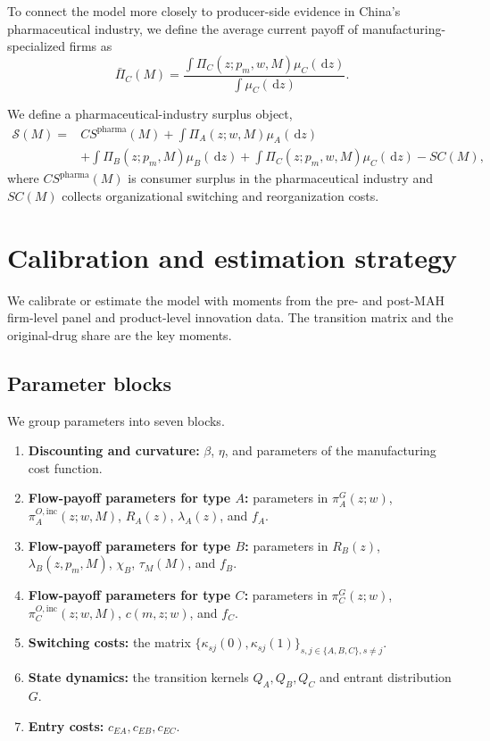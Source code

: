 \documentclass[12pt]{article}
\newcommand{\1}{\mathbf{1}}
\newcommand{\dd}{\,\mathrm{d}}
\newcommand{\Surp}{\mathcal{S}}
\begin{document}
To connect the model more closely to producer-side evidence in China's pharmaceutical industry, we define the average current payoff of manufacturing-specialized firms as
\begin{equation}
\bar\Pi_C(M)=\frac{\int \Pi_C(z;p_m,w,M)\mu_C(\dd z)}{\int \mu_C(\dd z)}.
\end{equation}

We define a pharmaceutical-industry surplus object,
\begin{equation}
\begin{aligned}
\Surp(M)={}&CS^{\mathrm{pharma}}(M)+\int \Pi_A(z;w,M)\mu_A(\dd z)\\
&+\int \Pi_B(z;p_m,M)\mu_B(\dd z)+\int \Pi_C(z;p_m,w,M)\mu_C(\dd z)-SC(M),
\end{aligned}
\label{eq:industry_surplus}
\end{equation}
where $CS^{\mathrm{pharma}}(M)$ is consumer surplus in the pharmaceutical industry and $SC(M)$ collects organizational switching and reorganization costs.

\section{Calibration and estimation strategy}

We calibrate or estimate the model with moments from the pre- and post-MAH firm-level panel and product-level innovation data. The transition matrix and the original-drug share are the key moments.

\subsection{Parameter blocks}

We group parameters into seven blocks.
\begin{enumerate}[leftmargin=2em]
    \item \textbf{Discounting and curvature:} $\beta$, $\eta$, and parameters of the manufacturing cost function.
    \item \textbf{Flow-payoff parameters for type $A$:} parameters in $\pi_A^G(z;w)$, $\pi_A^{O,\mathrm{inc}}(z;w,M)$, $R_A(z)$, $\lambda_A(z)$, and $f_A$.
    \item \textbf{Flow-payoff parameters for type $B$:} parameters in $R_B(z)$, $\lambda_B(z,p_m,M)$, $\chi_B$, $\tau_M(M)$, and $f_B$.
    \item \textbf{Flow-payoff parameters for type $C$:} parameters in $\pi_C^G(z;w)$, $\pi_C^{O,\mathrm{inc}}(z;w,M)$, $c(m,z;w)$, and $f_C$.
    \item \textbf{Switching costs:} the matrix $\{\kappa_{sj}(0),\kappa_{sj}(1)\}_{s,j\in\{A,B,C\},s\neq j}$.
    \item \textbf{State dynamics:} the transition kernels $Q_A,Q_B,Q_C$ and entrant distribution $G$.
    \item \textbf{Entry costs:} $c_{EA},c_{EB},c_{EC}$.
\end{enumerate}
\end{document}
